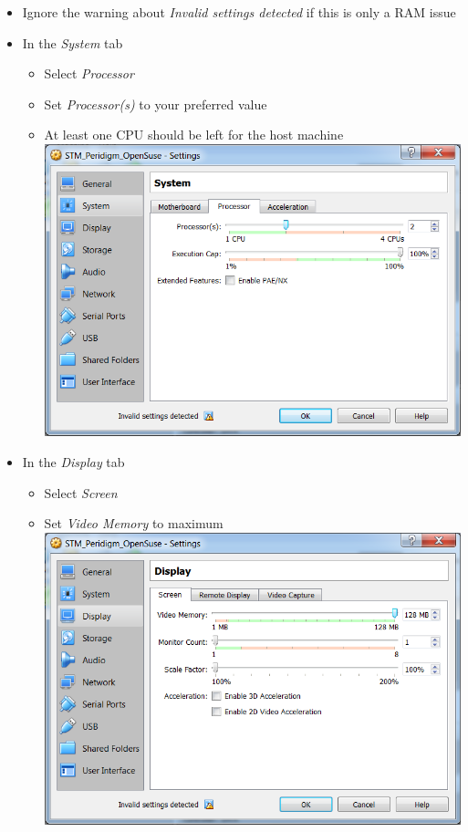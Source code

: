 \begin{enumerate}[noitemsep]
\begin{itemize}
\begin{itemize}
    \end{itemize}
    \item Ignore the warning about \textit{Invalid settings detected} if this is only a RAM issue
    \item In the \textit{System} tab
    \begin{itemize}
      \item Select \textit{Processor}
      \item Set \textit{Processor(s)} to your preferred value
      \item At least one CPU should be left for the host machine\\
      \includegraphics[scale=\screenshotscalefac]{Figures/VirtualBox_VirtualMachine_Settings_System_Processor}
    \end{itemize}
    \item In the \textit{Display} tab
    \begin{itemize}
      \item Select \textit{Screen}
      \item Set \textit{Video Memory} to maximum\\
      \includegraphics[scale=\screenshotscalefac]{Figures/VirtualBox_VirtualMachine_Settings_Display_Screen}

\end{itemize}
\end{itemize}
\end{enumerate}

